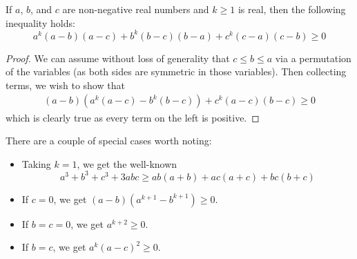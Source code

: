 \documentclass[12pt]{article}
\newcommand{\<}{\langle}
\renewcommand{\>}{\rangle}
\begin{document}
If $a$, $b$, and $c$ are non-negative real numbers and $k\geq 1$ is real, then the following inequality holds: 
\[
a^k(a-b)(a-c)+b^k(b-c)(b-a)+c^k(c-a)(c-b)\geq 0
\]

\begin{proof}
We can assume without loss of generality that $c\leq b\leq a$ via a permutation of the variables (as both sides are symmetric in those variables).  Then collecting terms, we wish to show that 
\begin{align*}
(a-b)\left(a^k(a-c)-b^k(b-c)\right)+c^k(a-c)(b-c)\geq 0
\end{align*}
which is clearly true as every term on the left is positive.\end{proof}

There are a couple of special cases worth noting:
\begin{itemize}
\item Taking $k=1$, we get the well-known $$ a^3 + b^3 + c^3 + 3abc \geq ab(a+b) + ac(a+c) + bc(b+c) $$
\item If $c=0$, we get $(a-b)(a^{k+1}-b^{k+1})\geq0$.
\item If $b=c=0$, we get $a^{k+2}\geq0$.
\item If $b=c$, we get $a^{k}(a-c)^2\geq 0$.
\end{itemize}
\end{document}
